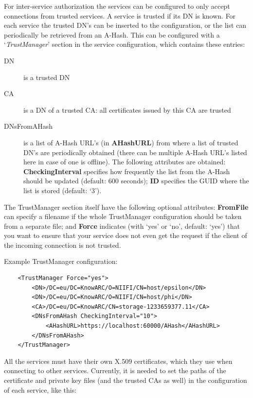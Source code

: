 \documentclass{book}
\begin{document}
For inter-service authorization the services can be configured to only accept connections from trusted services. A service is trusted if its DN is known. For each service the trusted DN's can be inserted to the configuration, or the list can periodically be retrieved from an A-Hash. This can be configured with a `\emph{TrustManager}' section in the service configuration, which contains these entries:

\begin{description}
    \item[DN] is a trusted DN
    \item[CA] is a DN of a trusted CA: all certificates issued by this CA are trusted
    \item[DNsFromAHash] is a list of A-Hash URL's (in \textbf{AHashURL}) from where a list of trusted DN's are periodically obtained (there can be multiple A-Hash URL's listed here in case of one is offline). The following attributes are obtained: \textbf{CheckingInterval} specifies how frequently the list from the A-Hash should be updated (default: 600 seconds); \textbf{ID} specifies the GUID where the list is stored (default: `3').
\end{description}

The TrustManager section itself have the following optional attributes: \textbf{FromFile} can specify a filename if the whole TrustManager configuration should be taken from a separate file; and \textbf{Force} indicates (with `yes' or `no', default: `yes') that you want to ensure that your service does not even get the request if the client of the incoming connection is not trusted. 

Example TrustManager configuration:

\begin{verbatim}
    <TrustManager Force="yes">
        <DN>/DC=eu/DC=KnowARC/O=NIIFI/CN=host/epsilon</DN>
        <DN>/DC=eu/DC=KnowARC/O=NIIFI/CN=host/phi</DN>
        <CA>/DC=eu/DC=KnowARC/CN=storage-1233659377.11</CA>
        <DNsFromAHash CheckingInterval="10">
            <AHashURL>https://localhost:60000/AHash</AHashURL>
        </DNsFromAHash>
    </TrustManager>
\end{verbatim}

All the services must have their own X.509 certificates, which they use when connecting to other services. Currently, it is needed to set the paths of the certificate and private key files (and the trusted CAs as well) in the configuration of each service, like this:
\end{document}
